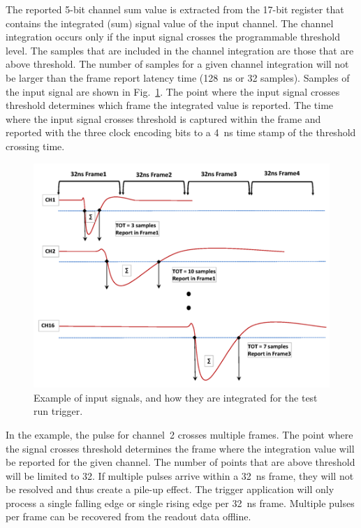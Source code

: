The reported 5-bit channel sum value is extracted from the 17-bit register that contains the integrated (sum) signal value of the input channel.  The channel integration occurs only if the input signal crosses the programmable threshold level.  The samples that are included in the channel integration are those that are above threshold.  The number of samples for a given channel integration will not be larger than the frame report latency time (128~ns or 32 samples). Samples of the input signal are shown in Fig.~\ref{fig:trigsamples}. The point where the input signal crosses threshold determines which frame the integrated value is reported.  The time where the input signal crosses threshold is captured within the frame and reported with the three clock encoding bits to a 4~ns time stamp of the threshold crossing time.
\begin{figure}[t]
\includegraphics[scale=0.9]{test2012/trigger//trigger_pulse_samples}
\caption{\small{Example of input signals, and how they are integrated for the test run trigger.}}\label{fig:trigsamples}
\end{figure}
In the example, the pulse for channel~2 crosses multiple frames.  The point where the signal crosses threshold determines the frame where the integration value will be reported for the given channel.  The number of points that are above threshold will be limited to 32. If multiple pulses arrive within a 32~ns frame, they will not be resolved and thus create a pile-up effect.  The trigger application will only process a single falling edge or single rising edge per 32~ns frame. Multiple pulses per frame can be recovered from the readout data offline.

